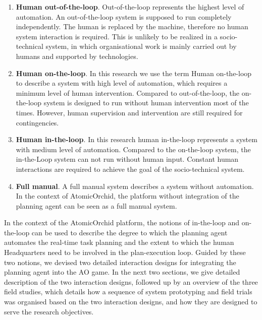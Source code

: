 \begin{enumerate}
\item \textbf{Human out-of-the-loop}.
Out-of-the-loop represents the highest level of automation. An out-of-the-loop system is supposed to run completely independently. The human is replaced by the machine, therefore no human system interaction is required. This is unlikely to be realized in a socio-technical system, in which organisational work is mainly carried out by humans and supported by technologies.  \\

\item \textbf{Human on-the-loop}.
In this research we use the term Human on-the-loop to describe a system with high level of automation, which requires a minimum level of human intervention. Compared to out-of-the-loop, the on-the-loop system is designed to run without human intervention most of the times. However, human supervision and intervention are still required for contingencies. 

\item \textbf{Human in-the-loop}.
In this research human in-the-loop represents a system with medium level of automation. Compared to the on-the-loop system, the in-the-Loop system can not run without human input. Constant human interactions are required to achieve the goal of the socio-technical system. \\

\item \textbf{Full manual}.
A full manual system describes a system without automation. In the context of AtomicOrchid, the platform without integration of the planning agent can be seen as a full manual system. 

\end{enumerate}

In the context of the AtomicOrchid platform, the notions of in-the-loop and on-the-loop can be used to describe the degree to which the planning agent automates the real-time task planning and the extent to which the human Headquarters need to be involved in the plan-execution loop. Guided by these two notions, we devised two detailed interaction designs for integrating the planning agent into the \ac{AO} game. In the next two sections, we give detailed description of the two interaction designs, followed up by an overview of the three field studies, which details how a sequence of system prototyping  and field trials was organised based on the two interaction designs, and how they are designed to serve the research objectives.\\

